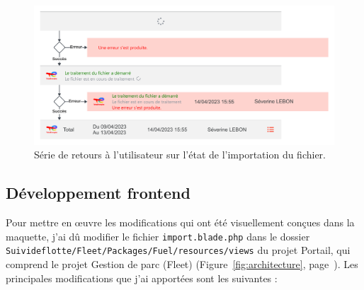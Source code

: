 \begin{figure}[ht]
    \centering
    \includegraphics[width=\textwidth]{img/feedbacks}
    \caption{Série de retours à l'utilisateur sur l'état de l'importation du fichier.}
    \label{fig:frontend-maquettage-feedbacks}
\end{figure}

\subsection{Développement frontend}

Pour mettre en œuvre les modifications qui ont été visuellement conçues dans la maquette, j'ai dû modifier le fichier \Verb|import.blade.php| dans le dossier \Verb|Suivideflotte/Fleet/Packages/Fuel/resources/views| du projet Portail, qui comprend le projet Gestion de parc (Fleet) (Figure~\ref{fig:architecture}, page~\pageref{fig:architecture}). Les principales modifications que j'ai apportées sont les suivantes :


